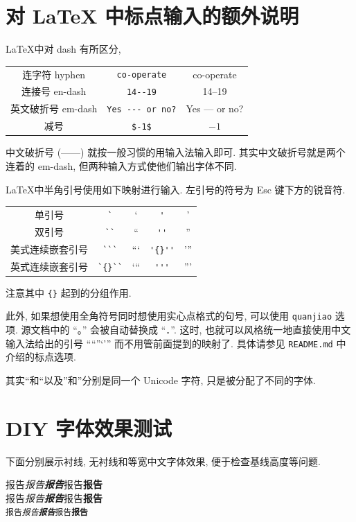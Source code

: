 \documentclass[font=notofandol]{mpltx}
\newcommand{\note}[1]{{\color{gray}#1}}
\begin{document}
\section{对 \LaTeX{} 中标点输入的额外说明}
\LaTeX 中对 dash 有所区分,
\begin{center}
    \begin{tabular}{c@{\quad}c@{\ $\rightarrow$\ }c}
        连字符 hyphen    & \verb|co-operate|     & co-operate \\
        连接号 en-dash   & \verb|14--19|         & 14--19 \\
        英文破折号 em-dash & \verb|Yes --- or no?| & Yes --- or no? \\
        减号            & \verb|$-1$|           & $-1$ \\
    \end{tabular}
\end{center}
中文破折号 (——) 就按一般习惯的用输入法输入即可.
\note{其实中文破折号就是两个连着的 em-dash, 但两种输入方式使他们输出字体不同.}

\LaTeX 中半角引号使用如下映射进行输入.
左引号的符号为 \textsf{Esc} 键下方的锐音符.
\begin{center}
    \begin{tabular}{c@{\quad}c@{\ $\rightarrow$\ }c@{\quad}c@{\ $\rightarrow$\ }c}
        单引号      & \verb|`|     & `     & \verb|'|     & ' \\
        双引号      & \verb|``|    & ``    & \verb|''|    & '' \\
        美式连续嵌套引号 & \verb|```|   & ```   & \verb|'{}''| & '{}'' \\
        英式连续嵌套引号 & \verb|`{}``| & `{}`` & \verb|'''|   & ''' \\
    \end{tabular}
\end{center}
注意其中 \texttt{\{\}} 起到的分组作用.

此外, 如果想使用全角符号同时想使用实心点格式的句号, 可以使用 \texttt{quanjiao} 选项.
源文档中的 ``。'' 会被自动替换成 ``．''.
这时, 也就可以风格统一地直接使用中文输入法给出的引号 ``“”‘’'' 而不用管前面提到的映射了.
具体请参见 \texttt{README.md} 中介绍的标点选项.

\note{其实“和``以及”和''分别是同一个 Unicode 字符, 只是被分配了不同的字体.}

\section{DIY 字体效果测试}

\newcommand{\testword}{报告}
\newcommand{\andbold}{\testword{}\textbf{\testword{}}}
\newcommand{\testline}{\testword{}\emph{\andbold{}}\andbold{}}

下面分别展示衬线, 无衬线和等宽中文字体效果, 便于检查基线高度等问题.
\begin{center}
    \textrm{\testline}\\
    \textsf{\testline}\\
    \texttt{\testline}
\end{center}
\end{document}
